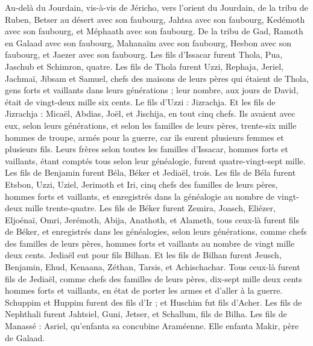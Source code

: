 \begin{multicols}{2}
Au-delà du Jourdain, vis-à-vis de Jéricho, vers l'orient du Jourdain, de la tribu de Ruben, Betser au désert avec son faubourg, Jahtsa avec son faubourg,
Kedémoth avec son faubourg, et Méphaath avec son faubourg.
De la tribu de Gad, Ramoth en Galaad avec son faubourg, Mahanaïm avec son faubourg,
Hesbon avec son faubourg, et Jaezer avec son faubourg.
\VerseOne{}Les fils d'Issacar furent Thola, Pua, Jaschub et Schimron, quatre.
Les fils de Thola furent Uzzi, Rephaja, Jeriel, Jachmaï, Jibsam et Samuel, chefs des maisons de leurs pères qui étaient de Thola, gens forts et vaillants dans leurs générations ; leur nombre, aux jours de David, était de vingt-deux mille six cents.
Le fils d'Uzzi : Jizrachja. Et les fils de Jizrachja : Micaël, Abdias, Joël, et Jischija, en tout cinq chefs.
Ils avaient avec eux, selon leurs générations, et selon les familles de leurs pères, trente-six mille hommes de troupe, armés pour la guerre, car ils eurent plusieurs femmes et plusieurs fils.
Leurs frères selon toutes les familles d'Issacar, hommes forts et vaillants, étant comptés tous selon leur généalogie, furent quatre-vingt-sept mille.
Les fils de Benjamin furent Béla, Béker et Jediaël, trois.
Les fils de Béla furent Etsbon, Uzzi, Uziel, Jerimoth et Iri, cinq chefs des familles de leurs pères, hommes forts et vaillants, et enregistrés dans la généalogie au nombre de vingt-deux mille trente-quatre.
Les fils de Béker furent Zemira, Joasch, Eliézer, Eljoénaï, Omri, Jerémoth, Abija, Anathoth, et Alameth, tous ceux-là furent fils de Béker,
et enregistrés dans les généalogies, selon leurs générations, comme chefs des familles de leurs pères, hommes forts et vaillants au nombre de vingt mille deux cents.
Jediaël eut pour fils Bilhan. Et les fils de Bilhan furent Jeusch, Benjamin, Ehud, Kenaana, Zéthan, Tarsis, et Achischachar.
Tous ceux-là furent fils de Jediaël, comme chefs des familles de leurs pères, dix-sept mille deux cents hommes forts et vaillants, en état de porter les armes et d'aller à la guerre.
Schuppim et Huppim furent des fils d'Ir ; et Huschim fut fils d'Acher.
Les fils de Nephthali furent Jahtsiel, Guni, Jetser, et Schallum, fils de Bilha.
Les fils de Manassé : Asriel, qu'enfanta sa concubine Araméenne. Elle enfanta Makir, père de Galaad.

\end{multicols}

